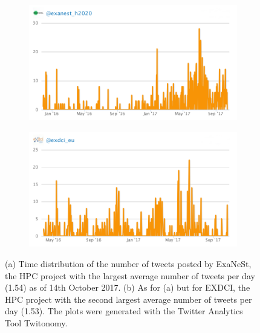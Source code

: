 \begin{figure}
 \centering
 \begin{subfigure}[t]{0.9\textwidth}
   \includegraphics[width=1\linewidth]{Images/Tweets_Exanest.png}
   \caption{} 
 \end{subfigure}

 \begin{subfigure}[t]{0.9\textwidth}
   \includegraphics[width=1\linewidth]{Images/Tweets_Exdci.png}
   \caption{}
 \end{subfigure}
 \caption{(a) Time distribution of the number of tweets posted by ExaNeSt, the HPC project with the largest average number of tweets per day (1.54) as of 14th October 2017. (b) As for (a) but for EXDCI, the HPC project with the second largest average number of tweets per day (1.53). The plots were generated with the Twitter Analytics Tool Twitonomy.} 
 \label{Tweets_Exanest-Exdci}
\end{figure}


